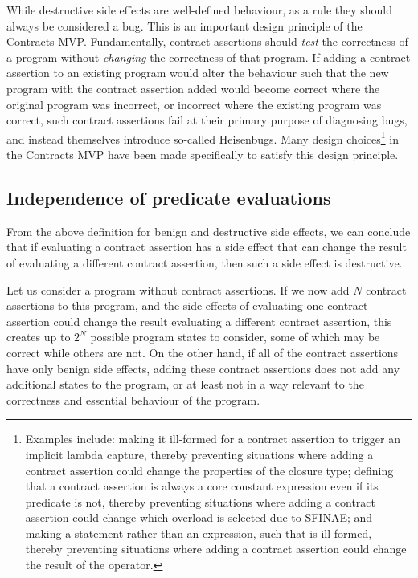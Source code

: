 While destructive side effects are well-defined behaviour, as a rule they should always be considered a bug. This is an important design principle of the Contracts MVP. Fundamentally, contract assertions should \emph{test} the correctness of a program without \emph{changing} the correctness of that program. If adding a contract assertion to an existing program would alter the behaviour such that the new program with the contract assertion added would become correct where the original program was incorrect, or incorrect where the existing program was correct, such contract assertions fail at their primary purpose of diagnosing bugs, and instead themselves introduce so-called Heisenbugs. Many design choices\footnote{Examples include: making it ill-formed for a contract assertion to trigger an implicit lambda capture, thereby preventing situations where adding a contract assertion could change the properties of the closure type; defining that a contract assertion is always a core constant expression even if its predicate is not, thereby preventing situations where adding a contract assertion could change which overload is selected due to SFINAE; and making  a statement rather than an expression, such that  is ill-formed, thereby preventing situations where adding a contract assertion could change the result of the  operator.} in the Contracts MVP have been made specifically to satisfy this design principle.

\subsection{Independence of predicate evaluations}
\label{subsec:indep}

From the above definition for benign and destructive side effects, we can conclude that if evaluating a contract assertion has a side effect that can change the result of evaluating a different contract assertion, then such a side effect is destructive.

Let us consider a program without contract assertions. If we now add $N$ contract assertions to this program, and the side effects of evaluating one contract assertion could change the result evaluating a different contract assertion, this creates up to $2^N$ possible program states to consider, some of which may be correct while others are not. On the other hand, if all of the contract assertions  have only benign side effects, adding these contract assertions does not add any additional states to the program, or at least not in a way relevant to the correctness and essential behaviour of the program.

